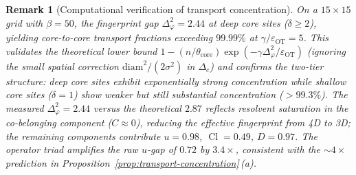 \documentclass[lettersize,journal]{IEEEtran}
\newtheorem{remark}{Remark}
\DeclareMathOperator{\Cl}{Cl}
\begin{document}
\begin{remark}[Computational verification of transport concentration]
On a $15 \times 15$ grid with $\beta = 50$, the fingerprint gap
$\Delta_\varphi^2 = 2.44$ at deep core sites ($\delta \geq 2$),
yielding core-to-core transport fractions exceeding $99.99\%$ at
$\gamma/\varepsilon_{\mathrm{OT}} = 5$. This validates the theoretical
lower bound $1 - (n/\theta_{\mathrm{core}}) \exp(-\gamma \Delta_\varphi^2 / \varepsilon_{\mathrm{OT}})$
(ignoring the small spatial correction $\mathrm{diam}^2/(2\sigma^2)$ in $\Delta_c$)
and confirms the two-tier structure: deep core sites exhibit exponentially
strong concentration while shallow core sites ($\delta = 1$) show
weaker but still substantial concentration ($>99.3\%$).
The measured $\Delta_\varphi^2 = 2.44$ versus the theoretical $2.87$ reflects
resolvent saturation in the co-belonging component ($C \approx 0$), reducing the
effective fingerprint from 4D to 3D; the remaining components contribute
$u = 0.98$, $\Cl = 0.49$, $D = 0.97$. The operator triad amplifies the
raw $u$-gap of $0.72$ by $3.4\times$, consistent with the $\sim\!4\times$
prediction in Proposition~\ref{prop:transport-concentration}\,(a).
\end{remark}
\end{document}
